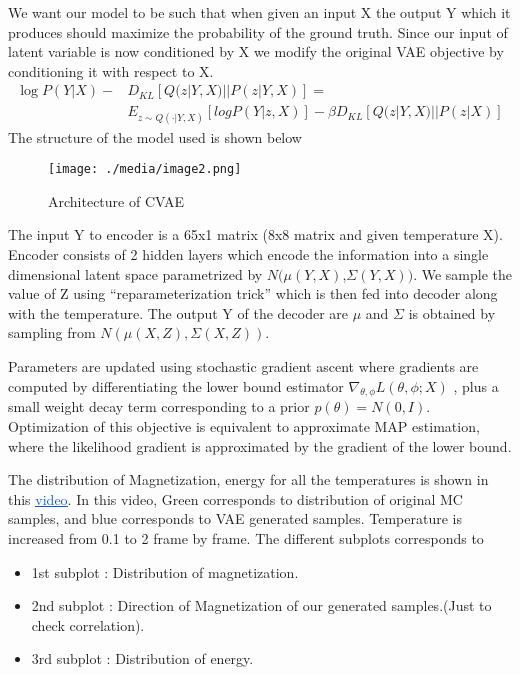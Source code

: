 \documentclass[12pt,a4paper]{article}
\begin{document}
We want our model to be such that when given an input X the output Y which it produces should maximize the probability of the ground truth. Since our input of latent variable is now conditioned by X we modify the original VAE objective by conditioning it with respect to X.
\begin{equation}
    \begin{split}
\log P(Y|X) - & D_{KL}[Q(z|Y,X)||P(z|Y,X)]  = \\ &E_{z \sim Q(·|Y,X)}[log P(Y|z,X)] - \beta D_{KL}[Q(z|Y,X)||P(z|X)]
    \end{split}
\end{equation}
The structure of the model used is shown below
\begin{figure}[!ht]
	\begin{Center}
		\texttt{[image: ./media/image2.png]}
		\caption{Architecture of CVAE}
	\end{Center}
\end{figure}
The input Y to encoder is a 65x1 matrix (8x8 matrix and given temperature X). Encoder consists of 2 hidden layers which encode the information into a single dimensional latent space parametrized by  $N(\mu(Y,X)$,$\Sigma(Y,X))$. We sample the value of Z using “reparameterization trick” which is then fed into decoder along with the temperature. The output Y of the decoder are $\mu$ and $\Sigma$ is obtained by sampling from $N(\mu(X,Z), \Sigma(X,Z))$.
\par Parameters are updated using stochastic gradient ascent where gradients are computed by differentiating the lower bound estimator $\nabla_{\theta,\phi}L(\theta, \phi; X)$ , plus a small weight decay term corresponding to a prior $p(\theta) = N(0,I)$. Optimization of this objective is equivalent to approximate MAP estimation, where the likelihood gradient is approximated by the gradient of the lower bound.\par The distribution of Magnetization, energy for all the temperatures is shown in this \href{https://drive.google.com/drive/folders/1uW0mRT_8JHZIB2RUIUFo09zFsNycdJfJ?usp=sharing}{\textcolor[HTML]{1155CC}{\uline{video}}}. In this video, Green corresponds to distribution of original MC samples, and blue corresponds to VAE generated samples. Temperature is increased from 0.1 to 2 frame by frame. The different subplots corresponds to
\begin{itemize}
    \item 1st subplot : Distribution of magnetization.
    \item 2nd subplot : Direction of Magnetization of our generated samples.(Just to check correlation).
    \item 3rd subplot : Distribution of energy.
\end{itemize}
\end{document}
